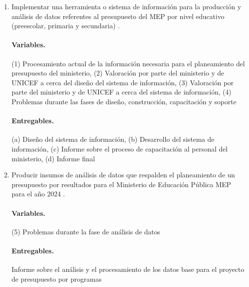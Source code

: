 \documentclass[a4paper, 9pt, conference]{article}              %
\theoremstyle{definition}
\begin{document}
\begin{enumerate}
	\item Implementar una herramienta o sistema de informaci\'on para la producci\'on y an\'alisis de datos referentes al presupuesto del MEP por nivel educativo (preescolar, primaria y secundaria) \cite{trd}.
	
	\paragraph{Variables.}

	(1) Procesamiento actual de la informaci\'on necesaria para el planeamiento del presupuesto del ministerio, (2) Valoraci\'on por parte del ministerio y de UNICEF a cerca del dise\~no del sistema de informaci\'on, (3) Valoraci\'on por parte del ministerio y de UNICEF a cerca del sistema de informaci\'on, (4) Problemas durante las fases de dise\~no, construcci\'on, capacitaci\'on y soporte
	
	\paragraph{Entregables.}

	(a) Dise\~no del sistema de informaci\'on, (b) Desarrollo del sistema de informaci\'on, (c) Informe sobre el proceso de capacitaci\'on al personal del ministerio, (d) Informe final

	\item Producir insumos de an\'alisis de datos que respalden el planeamiento de un presupuesto por resultados para el Ministerio de Educaci\'on P\'ublica MEP para el a\~no 2024 \cite{trd}.
	
	\paragraph{Variables.}

	(5) Problemas durante la fase de an\'alisis de datos
	
	\paragraph{Entregables.}

	Informe sobre el an\'alisis y el procesamiento de los datos base para el proyecto de presupuesto por programas
\end{enumerate}

\end{document}
